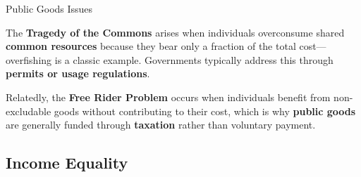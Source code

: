 \documentclass[10pt]{article}
\begin{document}
    \begin{core}{Public Goods Issues}

      The \textbf{Tragedy of the Commons} arises when individuals overconsume shared \textbf{common resources} because they bear only a fraction of the total cost---overfishing is a classic example. Governments typically address this through \textbf{permits or usage regulations}. 

      Relatedly, the \textbf{Free Rider Problem} occurs when individuals benefit from non-excludable goods without contributing to their cost, which is why \textbf{public goods} are generally funded through \textbf{taxation} rather than voluntary payment.

    \end{core}

  \subsection{Income Equality}
\end{document}
